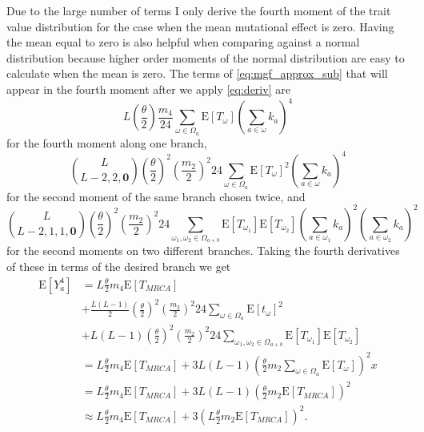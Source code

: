 \documentclass{article}
\newcommand{\T}{\frac{\theta}{2}}
\newcommand{\E}{\mathrm{E}}
\begin{document}
Due to the large number of terms I only derive the fourth moment
of the trait
value distribution for the case when the mean mutational effect is zero. Having
the mean equal to zero is also helpful when comparing against a normal
distribution because higher order moments of the normal distribution are easy to
calculate when the mean is zero. The terms of \eqref{eq:mgf_approx_sub} that
will appear in the fourth moment after we apply \eqref{eq:deriv} are
\begin{equation*}
  L \left(\T\right) \frac{m_4}{24}
  \sum_{\omega \in \Omega_a} \E[T_\omega] \left(\sum_{a \in \omega} k_a\right)^4
\end{equation*}
for the fourth moment along one branch,
\begin{equation*}
  \binom{L}{L-2,2,\mathbf{0}}\left(\T\right)^2\left(\frac{m_2}{2}\right)^2
  24 \sum_{\omega \in \Omega_a} \E[T_\omega]^2 \left(\sum_{a \in \omega} k_a\right)^4
\end{equation*}
for the second moment of the same branch chosen twice, and
\begin{equation*}
  \binom{L}{L-2,1,1,\mathbf{0}}\left(\T\right)^2\left(\frac{m_2}{2}\right)^2
  24 \sum_{\omega_1 , \omega_2 \in \Omega_{a+b}} \E[T_{\omega_1}]\E[T_{\omega_2}]
  \left(\sum_{a \in \omega_1} k_a\right)^2\left(\sum_{a \in \omega_2} k_a\right)^2
\end{equation*}
for the second moments on two different branches. Taking the fourth derivatives
of these in terms of the desired branch we get
\begin{align}
  \label{eq:mom4}
  \E[Y_a^4] &= L\T m_4 \E[T_{MRCA}] \nonumber \\
  &+ \frac{L(L-1)}{2} \left(\T\right)^2\left( \frac{m_2}{2} \right)^2
  24 \sum_{\omega \in \Omega_a} \E[t_\omega]^2 \nonumber \\
  &+ L(L-1) \left(\T\right)^2\left( \frac{m_2}{2} \right)^2
  24 \sum_{\omega_1 , \omega_2 \in \Omega_{a+b}} \E[T_{\omega_1}]\E[T_{\omega_2}] \nonumber \\
  &= L\T m_4 \E[T_{MRCA}] +
  3L(L-1)\left( \T m_2 \sum_{\omega \in \Omega_a} \E[T_\omega] \right)^2x \nonumber \\
  &= L\T m_4 \E[T_{MRCA}] +
  3L(L-1)\left( \T m_2 \E[T_{MRCA}] \right)^2 \\
  &\approx L\T m_4 \E[T_{MRCA}] +
  3\left(L \T m_2 \E[T_{MRCA}] \right)^2. \nonumber 
\end{align}
\end{document}
